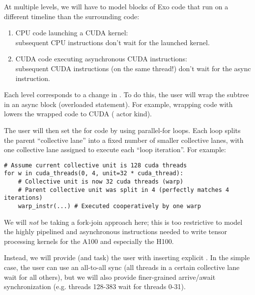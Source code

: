 \filbreak
At multiple levels, we will have to model blocks of Exo code that run on a different timeline than the surrounding code:
\begin{enumerate}
  \item CPU code launching a CUDA kernel:\\
  subsequent CPU instructions don't wait for the launched kernel.
  \item CUDA code executing asynchronous CUDA instructions:\\
  subsequent CUDA instructions (on the same thread!) don't wait for the async instruction.
\end{enumerate}

\filbreak
{} Each level corresponds to a change in .
To do this, the user will wrap the subtree in an async block (overloaded  statement).
For example, wrapping code with  lowers the wrapped code to CUDA ( actor kind).

\filbreak
{} The user will then set the  for code by using parallel-for loops.
Each loop splits the parent ``collective lane'' into a fixed number of smaller collective lanes, with one collective lane assigned to execute each ``loop iteration''. For example:

{\color{lightttColor}
\begin{verbatim}
# Assume current collective unit is 128 cuda threads
for w in cuda_threads(0, 4, unit=32 * cuda_thread):
    # Collective unit is now 32 cuda threads (warp)
    # Parent collective unit was split in 4 (perfectly matches 4 iterations)
    warp_instr(...) # Executed cooperatively by one warp
\end{verbatim}
}

\filbreak
{}
We will \textit{not} be taking a fork-join approach here; this is too restrictive to model the highly pipelined and asynchronous instructions needed to write tensor processing kernels for the A100 and especially the H100.

\filbreak
Instead, we will provide (and task) the user with inserting explicit .
In the simple case, the user can use an all-to-all sync (all threads in a certain collective lane wait for all others),
but we will also provide finer-grained arrive/await synchronization (e.g. threads 128-383 wait for threads 0-31).

